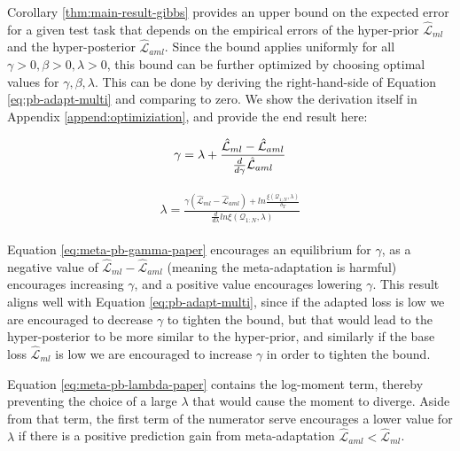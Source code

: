 \documentclass{article}
\theoremstyle{definition}
\begin{document}
Corollary \ref{thm:main-result-gibbs} provides an upper bound on the expected error for a given test task that depends on the empirical errors of the hyper-prior $\hat{\mathcal{L}}_{ml}$ and the hyper-posterior $\hat{\mathcal{L}}_{aml}$. 
Since the bound applies uniformly for all $\gamma>0,\beta>0,\lambda>0$, this bound can be further optimized by choosing optimal values for $\gamma, \beta, \lambda$. This can be done by deriving the right-hand-side of Equation \ref{eq:pb-adapt-multi} and comparing to zero. 
We show the derivation itself in Appendix \ref{append:optimiziation}, and provide the end result here:

\begin{align} \label{eq:meta-pb-gamma-paper}
\begin{split}
\gamma = \lambda+\frac{\hat{\mathcal{L}}_{ml}-\hat{\mathcal{L}}_{aml}}{\frac{d}{d\gamma}\hat{\mathcal{L}}_{aml}}
\end{split}\hfill
\end{align}

\begin{align} \label{eq:meta-pb-lambda-paper}
\begin{split}
\lambda = \frac{\gamma(\hat{\mathcal{L}}_{ml}-\hat{\mathcal{L}}_{aml})+ln\frac{\xi(\mathcal{Q}_{1:N},\lambda)}{\delta_T}}{\frac{d}{d\lambda}ln\xi(\mathcal{Q}_{1:N},\lambda)}
\end{split}
\end{align}

Equation \ref{eq:meta-pb-gamma-paper} encourages an equilibrium for $\gamma$, as a negative value of $\hat{\mathcal{L}}_{ml}-\hat{\mathcal{L}}_{aml}$ (meaning the meta-adaptation is harmful) encourages increasing $\gamma$, and a positive value encourages lowering $\gamma$.
This result aligns well with Equation \ref{eq:pb-adapt-multi}, since if the adapted loss is low we are encouraged to decrease $\gamma$ to tighten the bound, but that would lead to the hyper-posterior to be more similar to the hyper-prior, and similarly if the base loss $\hat{\mathcal{L}}_{ml}$ is low we are encouraged to increase $\gamma$ in order to tighten the bound.

Equation \ref{eq:meta-pb-lambda-paper} contains the log-moment term, thereby preventing the choice of a large $\lambda$ that would cause the moment to diverge. Aside from that term, 
the first term of the numerator serve encourages a lower value for $\lambda$ if there is a positive prediction gain from meta-adaptation $\hat{\mathcal{L}}_{aml}<\hat{\mathcal{L}}_{ml}$. 
\end{document}
